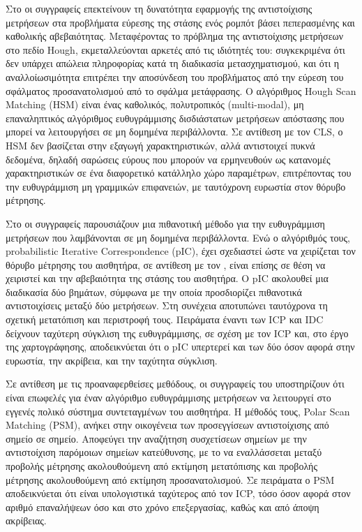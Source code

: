 Στο \cite{Censia} οι συγγραφείς επεκτείνουν τη δυνατότητα εφαρμογής της
αντιστοίχισης μετρήσεων στα προβλήματα εύρεσης της στάσης ενός ρομπότ βάσει
πεπερασμένης και καθολικής αβεβαιότητας. Μεταφέροντας το πρόβλημα της
αντιστοίχισης μετρήσεων στο πεδίο Hough, εκμεταλλεύονται αρκετές από τις
ιδιότητές του: συγκεκριμένα ότι δεν υπάρχει απώλεια πληροφορίας κατά τη
διαδικασία μετασχηματισμού, και ότι η αναλλοίωσιμότητα επιτρέπει την αποσύνδεση
του προβλήματος από την εύρεση του σφάλματος προσανατολισμού από το σφάλμα
μετάφρασης. Ο αλγόριθμος Hough Scan Matching (HSM) είναι ένας καθολικός,
πολυτροπικός (multi-modal), μη επαναληπτικός αλγόριθμος ευθυγράμμισης
δισδιάστατων μετρήσεων απόστασης που μπορεί να λειτουργήσει σε μη δομημένα
περιβάλλοντα. Σε αντίθεση με τον CLS, ο HSM δεν βασίζεται στην εξαγωγή
χαρακτηριστικών, αλλά αντιστοιχεί πυκνά δεδομένα, δηλαδή σαρώσεις εύρους που
μπορούν να ερμηνευθούν ως κατανομές χαρακτηριστικών σε ένα διαφορετικό
κατάλληλο χώρο παραμέτρων, επιτρέποντας του την ευθυγράμμιση μη γραμμικών
επιφανειών, με ταυτόχρονη ευρωστία στον θόρυβο μέτρησης.

Στο \cite{Montesano2005} οι συγγραφείς παρουσιάζουν μια πιθανοτική μέθοδο για
την ευθυγράμμιση μετρήσεων που λαμβάνονται σε μη δομημένα περιβάλλοντα. Ενώ ο
αλγόριθμός τους, probabilistic Iterative Correspondence (pIC), έχει σχεδιαστεί
ώστε να χειρίζεται τον θόρυβο μέτρησης του αισθητήρα, σε αντίθεση με τον
\cite{Pfistera}, είναι επίσης σε θέση να χειριστεί και την αβεβαιότητα της
στάσης του αισθητήρα. O pIC ακολουθεί μια διαδικασία δύο βημάτων, σύμφωνα με
την οποία προσδιορίζει πιθανοτικά αντιστοιχίσεις μεταξύ δύο μετρήσεων. Στη
συνέχεια αποτυπώνει ταυτόχρονα τη σχετική μετατόπιση και περιστροφή τους.
Πειράματα έναντι των ICP και IDC δείχνουν ταχύτερη σύγκλιση της ευθυγράμμισης,
σε σχέση με τον ICP και, στο έργο της χαρτογράφησης, αποδεικνύεται ότι ο pIC
υπερτερεί και των δύο όσον αφορά στην ευρωστία, την ακρίβεια, και την ταχύτητα
σύγκλιση.

Σε αντίθεση με τις προαναφερθείσες μεθόδους, οι συγγραφείς του \cite{Diosi2005}
υποστηρίζουν ότι είναι επωφελές για έναν αλγόριθμο ευθυγράμμισης μετρήσεων να
λειτουργεί στο εγγενές πολικό σύστημα συντεταγμένων του αισθητήρα. Η μέθοδός
τους, Polar Scan Matching (PSM), ανήκει στην οικογένεια των προσεγγίσεων
αντιστοίχισης από σημείο σε σημείο. Αποφεύγει την αναζήτηση συσχετίσεων σημείων
με την αντιστοίχιση παρόμοιων σημείων κατεύθυνσης, με το να εναλλάσσεται μεταξύ
προβολής μέτρησης ακολουθούμενη από εκτίμηση μετατόπισης και προβολής μέτρησης
ακολουθούμενη από εκτίμηση προσανατολισμού. Σε πειράματα ο PSM αποδεικνύεται
ότι είναι υπολογιστικά ταχύτερος από τον ICP, τόσο όσον αφορά στον αριθμό
επαναλήψεων όσο και στο χρόνο επεξεργασίας, καθώς και από άποψη ακρίβειας.

